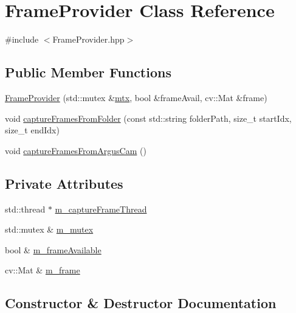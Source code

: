 \hypertarget{classFrameProvider}{}\section{Frame\+Provider Class Reference}
\label{classFrameProvider}


{\ttfamily \#include $<$Frame\+Provider.\+hpp$>$}

\subsection*{Public Member Functions}
\begin{DoxyCompactItemize}
\item 
\hyperlink{classFrameProvider_a03f142a7ea5878a32fec67f2b85f22fd}{Frame\+Provider} (std\+::mutex \&\hyperlink{campose__images__kitty__main2_8cpp_a29ac681ec3efa9e30e1ab1ab251b47f9}{mtx}, bool \&frame\+Avail, cv\+::\+Mat \&frame)
\item 
void \hyperlink{classFrameProvider_aa8334a484db470ee01b8718ab05ca997}{capture\+Frames\+From\+Folder} (const std\+::string folder\+Path, size\+\_\+t start\+Idx, size\+\_\+t end\+Idx)
\item 
void \hyperlink{classFrameProvider_a15097906b20d2d564b9bfea82c2f956c}{capture\+Frames\+From\+Argus\+Cam} ()
\end{DoxyCompactItemize}
\subsection*{Private Attributes}
\begin{DoxyCompactItemize}
\item 
std\+::thread $\ast$ \hyperlink{classFrameProvider_a08d38afae37b22f5c0117bdc950d83b4}{m\+\_\+capture\+Frame\+Thread}
\item 
std\+::mutex \& \hyperlink{classFrameProvider_a613fbc156614a7936ef4e05d8c9b0219}{m\+\_\+mutex}
\item 
bool \& \hyperlink{classFrameProvider_a46df01a978cd8d56cd4ffafb676d8a44}{m\+\_\+frame\+Available}
\item 
cv\+::\+Mat \& \hyperlink{classFrameProvider_afc074a4806d6406cbb395f98494a2172}{m\+\_\+frame}
\end{DoxyCompactItemize}


\subsection{Constructor \& Destructor Documentation}

